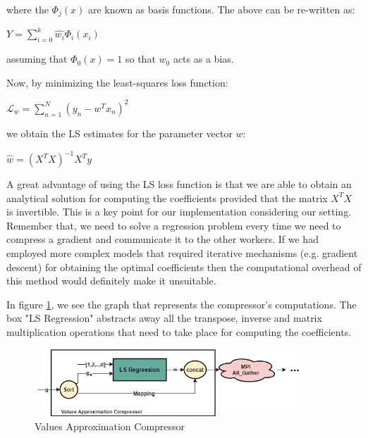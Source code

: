     where the $\Phi_j(x)$ are known as basis functions.
    The above can be re-written as:
    \begin{flushleft}
    \centering
    \setlength{\parindent}{40ex} 
    $Y = \sum_{i=0}^k \hat{w_i}\Phi_i(x_i)$
    \end{flushleft}

    assuming that $\Phi_0(x)=1$ so that $w_0$ acts as a bias.
    
    Now, by minimizing the least-squares loss function:
    \begin{flushleft}
    \centering
    \setlength{\parindent}{40ex} 
    $\mathcal{L}_w = \sum_{n=1}^N (y_n-w^T x_n)^2$
    \end{flushleft}
    we obtain the LS estimates for the parameter vector $w$:
    \begin{flushleft}
    \centering
    \setlength{\parindent}{40ex} 
    $\hat{w} = (X^T X)^{-1} X^T y$
    \end{flushleft}
    
    A great advantage of using the LS loss function is that we are able to obtain an analytical solution for computing the coefficients provided that the matrix $X^TX$ is invertible.
    This is a key point for our implementation considering our setting.
    Remember that, we need to solve a regression problem every time we need to compress a gradient and communicate it to the other workers.
    If we had employed more complex models that required iterative mechanisms (e.g. gradient descent) for obtaining the optimal coefficients then the computational overhead of this method would definitely make it unsuitable.
    
    In figure \ref{Regressor}, we see the graph that represents the compressor's computations. 
    The box "LS Regression" abstracts away all the transpose, inverse and matrix multiplication operations that need to take place for computing the coefficients.
    
    \begin{figure}[h]
    \centering
    \includegraphics[width=0.9\textwidth]{thesis/figures/regression.png}
    \caption{Values Approximation Compressor}
    \label{Regressor}
    \end{figure}


